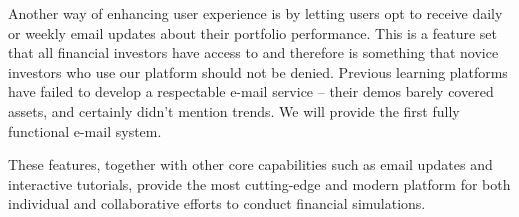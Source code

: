 Another way of enhancing user experience is by letting users opt to receive daily or weekly email updates about their portfolio performance. This is a feature set that all financial investors have access to and therefore is something that novice investors who use our platform should not be denied. Previous learning platforms have failed to develop a respectable e-mail service -- their demos barely covered assets, and certainly didn't mention trends. We will provide the first fully functional e-mail system.

These features, together with other core capabilities such as email updates and interactive tutorials, provide the most cutting-edge and modern platform for both individual and collaborative efforts to conduct financial simulations.
